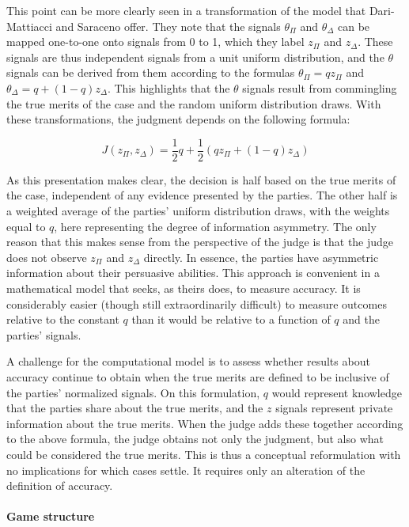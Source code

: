 \documentclass{article}
\begin{document}
This point can be more clearly seen in a transformation of the model that Dari-Mattiacci and Saraceno offer. They note that the signals $\theta_\Pi$ and $\theta_\Delta$ can be mapped one-to-one onto signals from 0 to 1, which they label $z_\Pi$ and $z_\Delta$. These signals are thus independent signals from a unit uniform distribution, and the $\theta$ signals can be derived from them according to the formulas $\theta_\Pi = qz_\Pi$ and $\theta_\Delta=q+(1-q)z_\Delta$. This highlights that the $\theta$ signals result from commingling the true merits of the case and the random uniform distribution draws. With these transformations, the judgment depends on the following formula:

\begin{equation}\label{equation:original}
J(z_\Pi, z_\Delta) = \frac{1}{2}q + \frac{1}{2} (qz_\Pi+(1-q)z_\Delta)
\end{equation}

As this presentation makes clear, the decision is half based on the true merits of the case, independent of any evidence presented by the parties. The other half is a weighted average of the parties' uniform distribution draws, with the weights equal to $q$, here representing the degree of information asymmetry. The only reason that this makes sense from the perspective of the judge is that the judge does not observe $z_\Pi$ and $z_\Delta$ directly. In essence, the parties have asymmetric information about their persuasive abilities. This approach is convenient in a mathematical model that seeks, as theirs does, to measure accuracy. It is considerably easier (though still extraordinarily difficult) to measure outcomes relative to the constant $q$ than it would be relative to a function of $q$ and the parties' signals. 

A challenge for the computational model is to assess whether results about accuracy continue to obtain when the true merits are defined to be inclusive of the parties' normalized signals. On this formulation, $q$ would represent knowledge that the parties share about the true merits, and the $z$ signals represent private information about the true merits. When the judge adds these together according to the above formula, the judge obtains not only the judgment, but also what could be considered the true merits. This is thus a conceptual reformulation with no implications for which cases settle. It requires only an alteration of the definition of accuracy.

\paragraph{Game structure}
\end{document}

